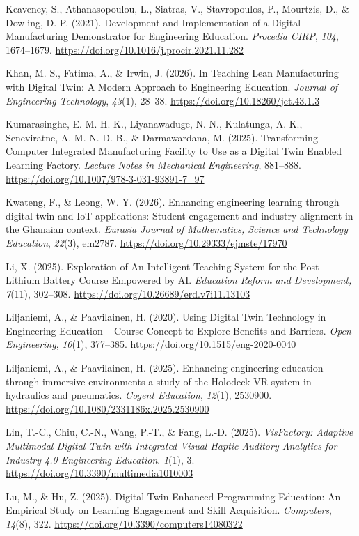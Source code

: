 Keaveney, S., Athanasopoulou, L., Siatras, V., Stavropoulos, P.,
Mourtzis, D., \& Dowling, D. P. (2021). Development and Implementation of
a Digital Manufacturing Demonstrator for Engineering Education.
\emph{Procedia CIRP}, \emph{104}, 1674--1679.
\url{https://doi.org/10.1016/j.procir.2021.11.282}

Khan, M. S., Fatima, A., \& Irwin, J. (2026). In Teaching Lean
Manufacturing with Digital Twin: A Modern Approach to Engineering
Education. \emph{Journal of Engineering Technology}, \emph{43}(1), 28--38.
\url{https://doi.org/10.18260/jet.43.1.3}

Kumarasinghe, E. M. H. K., Liyanawaduge, N. N., Kulatunga, A. K.,
Seneviratne, A. M. N. D. B., \& Darmawardana, M. (2025). Transforming
Computer Integrated Manufacturing Facility to Use as a Digital Twin
Enabled Learning Factory. \emph{Lecture Notes in Mechanical Engineering},
881--888. \url{https://doi.org/10.1007/978-3-031-93891-7_97}

Kwateng, F., \& Leong, W. Y. (2026). Enhancing engineering learning
through digital twin and IoT applications: Student engagement and
industry alignment in the Ghanaian context. \emph{Eurasia Journal of
Mathematics, Science and Technology Education}, \emph{22}(3), em2787.
\url{https://doi.org/10.29333/ejmste/17970}

Li, X. (2025). Exploration of An Intelligent Teaching System for the
Post-Lithium Battery Course Empowered by AI. \emph{Education Reform and
Development,} \emph{7}(11), 302--308.
\url{https://doi.org/10.26689/erd.v7i11.13103}

Liljaniemi, A., \& Paavilainen, H. (2020). Using Digital Twin Technology
in Engineering Education -- Course Concept to Explore Benefits and
Barriers. \emph{Open Engineering}, \emph{10}(1), 377--385.
\url{https://doi.org/10.1515/eng-2020-0040}

Liljaniemi, A., \& Paavilainen, H. (2025). Enhancing engineering
education through immersive environments-a study of the Holodeck VR
system in hydraulics and pneumatics. \emph{Cogent Education}, \emph{12}(1),
2530900. \url{https://doi.org/10.1080/2331186x.2025.2530900}

Lin, T.-C., Chiu, C.-N., Wang, P.-T., \& Fang, L.-D. (2025). \emph{VisFactory:
Adaptive Multimodal Digital Twin with Integrated Visual-Haptic-Auditory
Analytics for Industry 4.0 Engineering Education}. \emph{1}(1), 3.
\url{https://doi.org/10.3390/multimedia1010003}

Lu, M., \& Hu, Z. (2025). Digital Twin-Enhanced Programming Education: An
Empirical Study on Learning Engagement and Skill Acquisition.
\emph{Computers}, \emph{14}(8), 322. \url{https://doi.org/10.3390/computers14080322}

